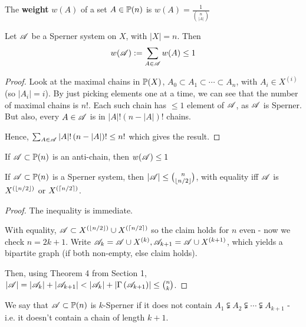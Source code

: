 \documentclass[a4paper]{article}
\begin{document}
\begin{defi}[Weight]
	The \textbf{weight} $w(A)$ of a set $A\in\P(n)$ is $w(A)=\frac{1}{\binom{n}{|A|}}$
\end{defi}

\begin{thm-num} 
	Let $\A$ be a Sperner system on $X$, with $|X|=n$. Then $$w(\A):=\sum_{A\in\A}w(A)\leq 1$$
\end{thm-num}
\begin{proof}
	Look at the maximal chains in $\P(X)$, $A_0\subset A_1\subset\cdots\subset A_n$, with $A_i\in X^{(i)}$ (so $|A_i|=i$). By just picking elements one at a time, we can see that the number of maximal chains is $n!$. Each such chain has $\leq 1$ element of $\A$, as $\A$ is Sperner. But also, every $A\in\A$ is in $|A|!\left(n-|A|\right)!$ chains.
	
	Hence, $\sum_{A\in\A}|A|!\left(n-|A|\right)!\leq n!$ which gives the result.
\end{proof}

\addtocounter{cor-num}{-1}
\begin{thm-num}
	If $\A\subset \P(n)$ is an anti-chain, then $w(\A)\leq 1$
\end{thm-num}

\begin{cor-num}
	If $\A\subset\P(n)$ is a Sperner system, then $|\A|\leq\binom{n}{\lf n/2\rf}$, with equality iff $\A$ is $X^{(\lf n/2\rf)}$ or $X^{(\lc n/2\rc)}$.
\end{cor-num}
\begin{proof}
	The inequality is immediate.
	
	With equality, $\A\subset X^{(\lf n/2\rf)}\cup X^{(\lc n/2\rc)}$ so the claim holds for $n$ even - now we check $n=2k+1$. Write $\A_k=\A\cup X^{(k)}, \A_{k+1}=\A\cup X^{(k+1)}$, which yields a bipartite graph (if both non-empty, else claim holds).
	
	Then, using Theorem 4 from Section 1, $|\A|=\left|\A_k\right|+\left|\A_{k+1}\right|<\left|\A_k\right|+\left|\Gamma\left(\A_{k+1}\right)\right|\leq\binom{n}{k}$.
\end{proof}

\begin{defi}[$k$-Sperner]
	We say that $\A\subset\P(n)$ is $k$-Sperner if it does not contain $A_1\subsetneqq A_2\subsetneqq \cdots\subsetneqq A_{k+1}$ - i.e. it doesn't contain a chain of length $k+1$.
\end{defi}
\end{document}
